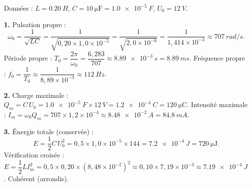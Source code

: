 \documentclass[11pt]{article}
\begin{document}
\begin{corrige}
Données : $L = \SI{0,20}{H}$, $C = \SI{10}{\micro\farad} = \SI{1,0e-5}{F}$, $U_0 = \SI{12}{V}$.

\textbf{1.} Pulsation propre :
\[
\omega_0 = \frac{1}{\sqrt{LC}} = \frac{1}{\sqrt{0,20 \times 1,0\times10^{-5}}} = \frac{1}{\sqrt{2,0\times10^{-6}}} = \frac{1}{1,414\times10^{-3}} \approx \SI{707}{rad/s}.
\]
Période propre : $T_0 = \dfrac{2\pi}{\omega_0} = \dfrac{6,283}{707} \approx \SI{8,89e-3}{s} = \SI{8,89}{ms}$.
Fréquence propre : $f_0 = \dfrac{1}{T_0} \approx \dfrac{1}{8,89\times10^{-3}} \approx \SI{112}{Hz}$.

\textbf{2.} Charge maximale : $Q_m = C\,U_0 = \SI{1,0e-5}{F} \times \SI{12}{V} = \SI{1,2e-4}{C} = \SI{120}{\micro\coulomb}$.
Intensité maximale : $I_m = \omega_0 Q_m = 707 \times 1,2\times10^{-4} \approx \SI{8,48e-2}{A} = \SI{84,8}{mA}$.

\textbf{3.} Énergie totale (conservée) :
\[
E = \frac{1}{2}C\,U_0^2 = 0,5 \times 1,0\times10^{-5} \times 144 = \SI{7,2e-4}{J} = \SI{720}{\micro\joule}.
\]
Vérification croisée : $E = \dfrac{1}{2}L I_m^2 = 0,5 \times 0,20 \times (8,48\times10^{-2})^2 \approx 0,10 \times 7,19\times10^{-3} \approx \SI{7,19e-4}{J}$. Cohérent (arrondis).
\end{corrige}
\end{document}
